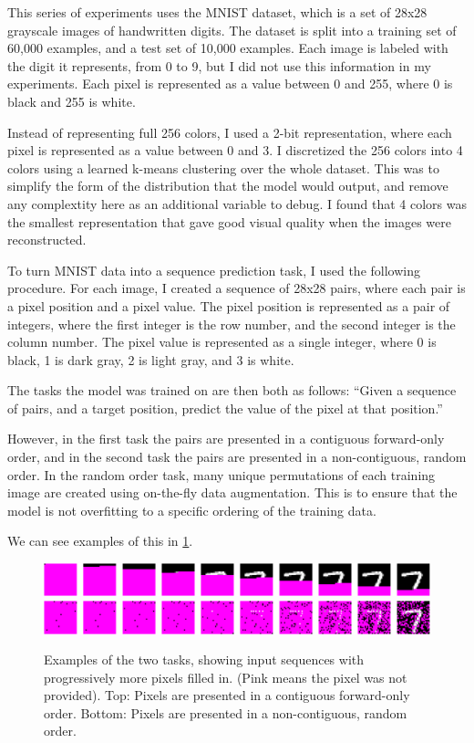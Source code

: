 This series of experiments uses the MNIST dataset, which is a set of 28x28 grayscale images of handwritten digits. The dataset is split into a training set of 60,000 examples, and a test set of 10,000 examples. Each image is labeled with the digit it represents, from 0 to 9, but I did not use this information in my experiments. Each pixel is represented as a value between 0 and 255, where 0 is black and 255 is white.

Instead of representing full 256 colors, I used a 2-bit representation, where each pixel is represented as a value between 0 and 3. I discretized the 256 colors into 4 colors using a learned k-means clustering over the whole dataset. This was to simplify the form of the distribution that the model would output, and remove any complextity here as an additional variable to debug. I found that 4 colors was the smallest representation that gave good visual quality when the images were reconstructed.

To turn MNIST data into a sequence prediction task, I used the following procedure. For each image, I created a sequence of 28x28 pairs, where each pair is a pixel position and a pixel value. The pixel position is represented as a pair of integers, where the first integer is the row number, and the second integer is the column number. The pixel value is represented as a single integer, where 0 is black, 1 is dark gray, 2 is light gray, and 3 is white.


The tasks the model was trained on are then both as follows: ``Given a sequence of pairs, and a target position, predict the value of the pixel at that position.''

However, in the first task the pairs are presented in a contiguous forward-only order, and in the second task the pairs are presented in a non-contiguous, random order. In the random order task, many unique permutations of each training image are created using on-the-fly data augmentation. This is to ensure that the model is not overfitting to a specific ordering of the training data.

We can see examples of this in \cref{fig:mnist-task-examples}.

\begin{figure}
    \centering
    \includegraphics[width=0.7\linewidth]{figures/examples-sequential.png}
    \includegraphics[width=0.7\linewidth]{figures/examples-random.png}
    \caption[Examples of the two MNIST training tasks]{Examples of the two tasks, showing input sequences with progressively more pixels filled in. (Pink means the pixel was not provided). Top: Pixels are presented in a contiguous forward-only order. Bottom: Pixels are presented in a non-contiguous, random order.}
    \label{fig:mnist-task-examples}
\end{figure}

